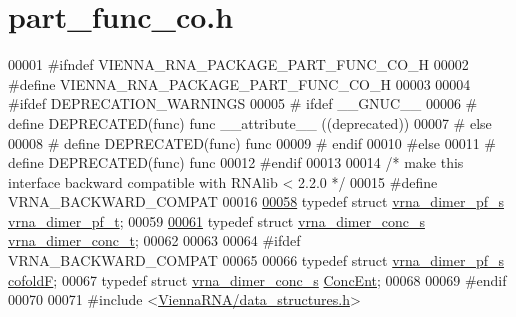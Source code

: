 \hypertarget{part__func__co_8h_source}{}\section{part\+\_\+func\+\_\+co.\+h}
\label{part__func__co_8h_source}

\begin{DoxyCode}
00001 \textcolor{preprocessor}{#ifndef VIENNA\_RNA\_PACKAGE\_PART\_FUNC\_CO\_H}
00002 \textcolor{preprocessor}{#define VIENNA\_RNA\_PACKAGE\_PART\_FUNC\_CO\_H}
00003 
00004 \textcolor{preprocessor}{#ifdef DEPRECATION\_WARNINGS}
00005 \textcolor{preprocessor}{# ifdef \_\_GNUC\_\_}
00006 \textcolor{preprocessor}{#  define DEPRECATED(func) func \_\_attribute\_\_ ((deprecated))}
00007 \textcolor{preprocessor}{# else}
00008 \textcolor{preprocessor}{#  define DEPRECATED(func) func}
00009 \textcolor{preprocessor}{# endif}
00010 \textcolor{preprocessor}{#else}
00011 \textcolor{preprocessor}{# define DEPRECATED(func) func}
00012 \textcolor{preprocessor}{#endif}
00013 
00014 \textcolor{comment}{/* make this interface backward compatible with RNAlib < 2.2.0 */}
00015 \textcolor{preprocessor}{#define VRNA\_BACKWARD\_COMPAT}
00016 
\hypertarget{part__func__co_8h_source_l00058}{}\hyperlink{group__pf__cofold_ga444df1587c9a2ca15b8eb25188f629c3}{00058} \textcolor{keyword}{typedef} \textcolor{keyword}{struct }\hyperlink{group__pf__cofold_structvrna__dimer__pf__s}{vrna\_dimer\_pf\_s}  \hyperlink{group__pf__cofold_structvrna__dimer__pf__s}{vrna\_dimer\_pf\_t};
00059 
\hypertarget{part__func__co_8h_source_l00061}{}\hyperlink{group__pf__cofold_gac48c2723444ecfdceafcfd525ca98322}{00061} \textcolor{keyword}{typedef} \textcolor{keyword}{struct }\hyperlink{group__pf__cofold_structvrna__dimer__conc__s}{vrna\_dimer\_conc\_s}  \hyperlink{group__pf__cofold_structvrna__dimer__conc__s}{vrna\_dimer\_conc\_t};
00062 
00063 
00064 \textcolor{preprocessor}{#ifdef VRNA\_BACKWARD\_COMPAT}
00065 
00066 \textcolor{keyword}{typedef} \textcolor{keyword}{struct }\hyperlink{group__pf__cofold_structvrna__dimer__pf__s}{vrna\_dimer\_pf\_s}    \hyperlink{group__pf__cofold_structvrna__dimer__pf__s}{cofoldF};
00067 \textcolor{keyword}{typedef} \textcolor{keyword}{struct }\hyperlink{group__pf__cofold_structvrna__dimer__conc__s}{vrna\_dimer\_conc\_s}  \hyperlink{group__pf__cofold_structvrna__dimer__conc__s}{ConcEnt};
00068 
00069 \textcolor{preprocessor}{#endif}
00070 
00071 \textcolor{preprocessor}{#include <\hyperlink{data__structures_8h}{ViennaRNA/data\_structures.h}>}

\end{DoxyCode}
